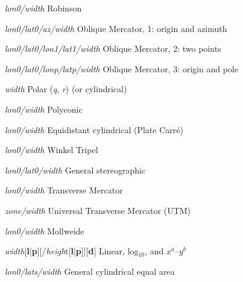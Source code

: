 \documentclass{article}
\begin{document}
\par 	{}\emph{lon0/width}	Robinson\par 

\par 	{}\emph{lon0/lat0/az/width}	Oblique Mercator, 1:	origin and azimuth\par 

\par 	{}\emph{lon0/lat0/lon1/lat1/width}	Oblique Mercator, 2:	two points\par 

\par 	{}\emph{lon0/lat0/lonp/latp/width}	Oblique Mercator, 3:	origin and pole\par 

\par 	{}\emph{width}	Polar (\emph{q}, \emph{r}) (or cylindrical)\par 

\par 	{}\emph{lon0/width}	Polyconic\par 

\par 	{}\emph{lon0/width}	Equidistant cylindrical (Plate Carr\'{e})\par 

\par 	{}\emph{lon0/width}	Winkel Tripel\par 

\par 	{}\emph{lon0/lat0/width}	General stereographic\par 

\par 	{}\emph{lon0/width}	Transverse Mercator\par 

\par 	{}\emph{zone/width}	Universal Transverse Mercator (UTM)\par 

\par 	{}\emph{lon0/width}	Mollweide\par 

\par 	{}\emph{width}[\textbf{l}|\textbf{p}][/\emph{heigh}t[\textbf{l}|\textbf{p}]][\textbf{d}]	Linear, log$_{10}$, and $x^a$--$y^b$\par 

\par 	{}\emph{lon0/lats/width}	General cylindrical equal area\par 
\end{document}
